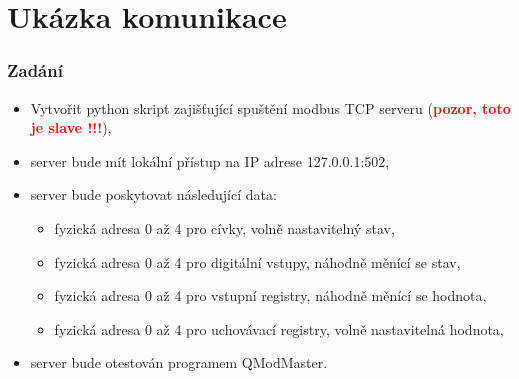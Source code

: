 \section{\texorpdfstring{Ukázka komunikace}{Ukazka komunikace}}

	\begin{frame}
    \frametitle{Zadání}
		
		\begin{itemize}
			\item Vytvořit python skript zajišťující spuštění modbus TCP serveru (\textcolor{red}{\textbf{pozor, toto je slave !!!}}),
			\item server bude mít lokální přístup na IP adrese 127.0.0.1:502,
			\item server bude poskytovat následující data:
			
			\begin{itemize}
				\item fyzická adresa 0 až 4 pro cívky, volně nastavitelný stav,
				\item fyzická adresa 0 až 4 pro digitální vstupy, náhodně měnící se stav,
				\item fyzická adresa 0 až 4 pro vstupní registry, náhodně měnící se hodnota,
				\item fyzická adresa 0 až 4 pro uchovávací registry, volně nastavitelná hodnota,
			\end{itemize}
			
			\item server bude otestován programem QModMaster.
		\end{itemize}
		
	\end{frame}
	
